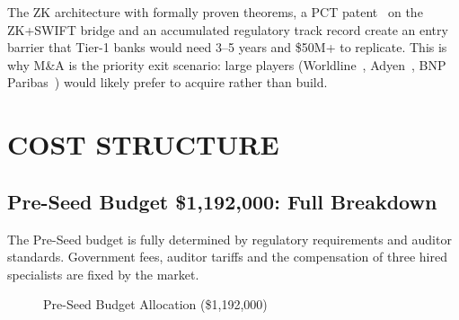 \documentclass[11pt,a4paper]{article}
\begin{document}
\begin{tcolorbox}[insightbox, title={The Technology Moat}]
The ZK architecture with formally proven theorems, a PCT patent~\cite{wipo_pct} on the ZK+SWIFT bridge and an accumulated regulatory track record create an entry barrier that Tier-1 banks would need 3--5 years and \$50M+ to replicate. This is why M\&A is the priority exit scenario: large players (Worldline~\cite{worldline_ar}, Adyen~\cite{adyen_ar}, BNP Paribas~\cite{bnp_ar}) would likely prefer to acquire rather than build.
\end{tcolorbox}


\FloatBarrier
\section{COST STRUCTURE}

\subsection*{Pre-Seed Budget \$1,192,000: Full Breakdown}

The Pre-Seed budget is fully determined by regulatory requirements and auditor standards. Government fees, auditor tariffs and the compensation of three hired specialists are fixed by the market.

\begin{figure}[htbp]
\centering
{}
\caption{Pre-Seed Budget Allocation (\$1,192,000)}
\end{figure}
\end{document}

